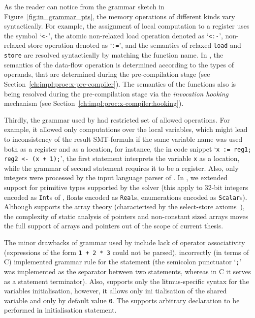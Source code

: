 As the reader can notice from the grammar sketch in Figure~\ref{fig:in_grammar_pts}, the memory operations of different kinds vary syntactically.
For example, the assignment of local computation to a register uses the symbol `\lstinline{<-}', the atomic non-relaxed load operation denoted as `\lstinline{<:-}', non-relaxed store operation denoted as `\lstinline{:=}', and the semantics of relaxed \lstinline{load} and \lstinline{store} are resolved syntactically by matching the function name.
In \porthos[2], the semantics of the data-flow operation is determined according to the types of operands, that are determined during the pre-compilation stage (see Section~\ref{ch:impl:proc:x-pre-compiler}).
The semantics of the functions also is being resolved during the pre-compilation stage via the \textit{invocation hooking} mechanism (see Section~\ref{ch:impl:proc:x-compiler:hooking}).

Thirdly, the grammar used by \porthos{} had restricted set of allowed operations. For example, it allowed only computations over the local variables, which might lead to inconsistency of the result SMT-formula if the same variable name was used both as a register and as a location, for instance, the in code snippet `\lstinline{x := reg1; reg2 <- (x + 1);}', the first statement interprets the variable \lstinline{x} as a location, while the grammar of second statement requires it to be a register. Also, only integers were processed by the input language parser of \porthos[1]. In \porthos[2], we extended support for primitive types supported by the  solver (this apply to 32-bit integers encoded as \texttt{Int}s of , floats encoded as \texttt{Real}s, enumerations encoded as \texttt{Scalar}s).
Although  supports the array theory (characterised by the select-store axioms~\cite{de2011z3}), the complexity of static analysis of pointers and non-constant sized arrays moves the full support of arrays and pointers out of the scope of current thesis.

The minor drawbacks of grammar used by \porthos[1] include lack of operator associativity (expressions of the form \lstinline{1 + 2 * 3} could not be parsed), incorrectly (in terms of C) implemented grammar rule for the statement (the semicolon punctuator `\lstinline{;}' was implemented as the separator between two statements, whereas in C it serves as a statement terminator). Also, \porthos[1] supports only the litmus-specific syntax for the variables initialisation, however, it allows only ini
tialisation of the shared variable and only by default value \lstinline{0}. The \porthos[2] supports arbitrary declaration to be performed in initialisation statement.


